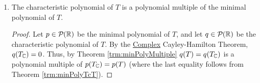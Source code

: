 \documentclass[../main.tex]{subfiles}
\begin{document}
\begin{itemize}
\begin{theorem}
\begin{enumerate}[label={\textup{(}\alph*\textup{)}}]
\begin{proof}
                \begin{equation*}
                    \dim p \leq \dim q = \dim V
                \end{equation*}
                as desired.
            \end{proof}
            \item The characteristic polynomial of $T$ is a polynomial multiple of the minimal polynomial of $T$.
            \begin{proof}
                Let $p\in\mathcal{P}_{}(\mathbb{R})$ be the minimal polynomial of $T$, and let $q\in\mathcal{P}_{}(\mathbb{R})$ be the characteristic polynomial of $T$. By the \hyperref[trm:ComplexCayleyHamilton]{Complex} Cayley-Hamilton Theorem, $q(T_{\mathbb{C}})=0$. Thus, by Theorem \ref{trm:minPolyMultiple} $q(T)=q(T_{\mathbb{C}})$ is a polynomial multiple of $p(T_{\mathbb{C}})=p(T)$ (where the last equality follows from Theorem \ref{trm:minPolyTcT}).
            \end{proof}
        \end{enumerate}
    \end{theorem}
\end{itemize}
\end{document}

